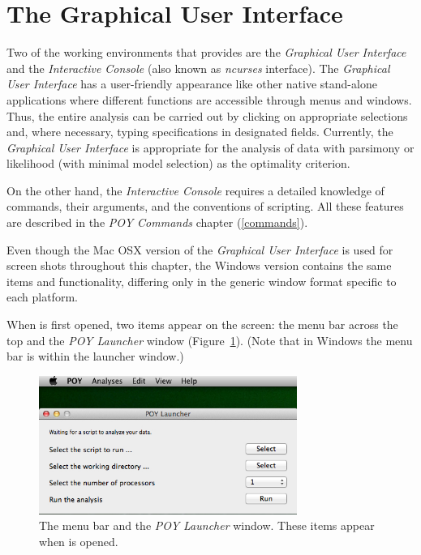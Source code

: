 \section{The Graphical User Interface}

Two of the working environments that \poy provides are the \emph{Graphical User Interface} and the 
\emph{Interactive Console} (also known as  \emph{ncurses} interface). The \emph{Graphical User 
Interface} has a user-friendly appearance like other native stand-alone applications where different 
functions are accessible through menus and windows. Thus, the entire analysis can be 
carried out by clicking on appropriate selections and, where necessary, typing specifications in 
designated fields. Currently, the \emph{Graphical User Interface} is appropriate for the analysis of 
data with parsimony or likelihood (with minimal model selection) as the optimality criterion.  

On the other hand, the \emph{Interactive Console} requires a detailed knowledge of \poy commands, 
their arguments, and the conventions of \poy scripting. All these features are described in the 
\emph{POY Commands} chapter (\ref{commands}).

Even though the Mac OSX version of the \emph{Graphical User Interface} is used for screen 
shots throughout this chapter, the Windows version contains the same items and 
functionality, differing only in the generic window format specific to each platform.

When \poy is first opened, two items appear on the screen: the \poy menu bar across the top and the 
\emph{POY Launcher} window (Figure~\ref{fig:menu_launcher_window}). (Note that in Windows the 
menu bar is within the launcher window.)

\begin{figure}[htpb]
    \begin{center}
        \includegraphics[width=0.75\textwidth]{doc/figures/menu_launcher_window.jpg}
    \end{center}
    \caption{The \poy menu bar and the \emph{POY Launcher} window. These items appear when \poy is opened.}
    \label{fig:menu_launcher_window}
\end{figure}

